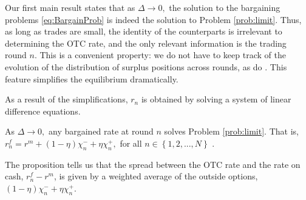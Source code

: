 \documentclass[12pt,american,english,notitlepage]{article}
\begin{document}
Our first main result states that as $\Delta\rightarrow0,$ the solution
to the bargaining problems \eqref{eq:BargainProb} is indeed the solution
to Problem \ref{prob:limit}. Thus, as long as trades are small, the identity of the counterparts is irrelevant to determining the OTC
rate, and the only relevant information is the trading round $n$.
This is a convenient property: we do not have to keep track of the
evolution of the distribution of surplus positions across rounds, as
do \citet{AL15-ECMA}. This feature simplifies the equilibrium dramatically.

As a result of the simplifications, $r_{n}$ is obtained by solving a system of linear difference equations.

\begin{proposition}\label{P_LimitingRates}
As $\Delta\rightarrow0,$ any bargained rate at round $n$ solves
Problem \ref{prob:limit}. That is, $r_{n}^{f}=r^{m}+\left(1-\eta\right)\chi_{n}^{-}+\eta\chi_{n}^{+},$
for all $n\in\left\{ 1,2,...,N\right\} $ .

\end{proposition}

The proposition tells us that the spread between the OTC rate and the
rate on cash, $r_{n}^{f}-r^{m}$, is given by a weighted average of
the outside options, $\left(1-\eta\right)\chi_{n}^{-}+\eta\chi_{n}^{+}$.
\end{document}
